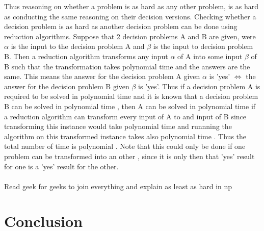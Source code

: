 \documentclass{article}
\begin{document}
Thus reasoning on whether a problem is as hard as any other problem, is as hard as conducting the same reasoning on their decision versions. Checking whether a decision problem is as hard as another decision problem can be done using reduction algorithms. Suppose that 2 decision problems A and B are given, were $\alpha$ is the input to the decision problem A and $\beta$ is the input to decision problem B. Then a reduction algorithm transforms any input $\alpha$ of A into some input $\beta$ of B such that the transformation takes polynomial time and the answers are the same. This means the answer for the decision problem A given $\alpha$ is 'yes' $\iff$ the answer for the decision problem B given $\beta$ is 'yes'. Thus if a decision problem A is required to be solved in polynomial time and it is known that a decision problem B can be solved in polynomial time , then A can be solved in polynomial time if a reduction algorithm can transform every input of A to and input of B since transforming this instance would take polynomial time and runnning the algorithm on this transformed instance takes also polynomial time . Thus the total number of time is polynomial . Note that this could only be done if one problem can be transformed into an other , since it is only then that 'yes' result for one is a 'yes' result for the other. \cite{cormen_leiserson_rivest_stein}\\
\\
Read geek for geeks to join everything and explain as least as hard in np	

\newpage
\section{Conclusion}
\newpage


\end{document}
